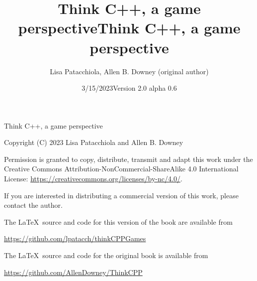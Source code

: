 \documentclass{book}
\title{Think C++, a game perspective}
\author{Lisa Patacchiola, Allen B. Downey (original author)}
\date{3/15/2023}
\begin{document}
\title {Think C++, a game perspective}
\date {Version 2.0 alpha 0.6}
\maketitle

\vspace{2in}
\begin{center}
{\Large Think C++, a game perspective}

\vspace{0.25in}

Copyright (C) 2023 Lisa Patacchiola and Allen B. Downey
\end{center}
\vspace{0.25in}

Permission is granted to copy, distribute, transmit and adapt this
work under the Creative Commons Attribution-NonCommercial-ShareAlike 4.0
International License: \url{https://creativecommons.org/licenses/by-nc/4.0/}.

If you are interested in distributing a commercial version of this
work, please contact the author.

\bigskip
The \LaTeX\ source and code for this version of the book are available from

\bigskip
\url{https://github.com/lpatacch/thinkCPPGames}

\bigskip
The \LaTeX\ source and code for the original book is available from

\bigskip
\url{https://github.com/AllenDowney/ThinkCPP}



\frontmatter

\tableofcontents

\mainmatter










\appendix


\printindex
\end{document}

